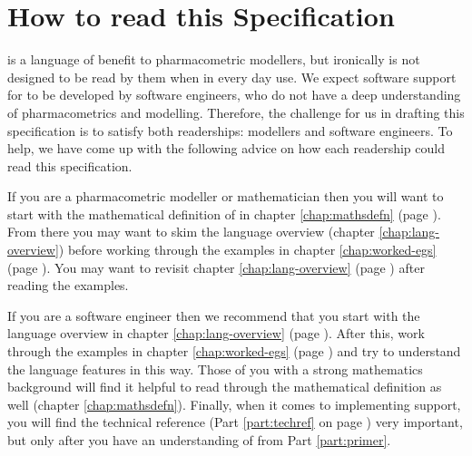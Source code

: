 \section{How to read this Specification}

\pharmml is a language of benefit to pharmacometric modellers, but ironically is not designed to be read by
them when in every day use. We expect software support for \pharmml to be developed by software engineers,
who do not have a deep understanding of pharmacometrics and modelling. Therefore, the challenge for us in
drafting this specification is to satisfy both readerships: modellers and software engineers. To help, we
have come up with the following advice on how each readership could read this specification.

If you are a pharmacometric modeller or mathematician then you will want to start with the mathematical
definition of \pharmml in chapter \ref{chap:mathsdefn} (page \pageref{chap:mathsdefn}). From there you
may want to skim the language overview (chapter \ref{chap:lang-overview}) before working through the
examples in chapter \ref{chap:worked-egs} (page \pageref{chap:worked-egs}). You may want to revisit
chapter \ref{chap:lang-overview} (page \pageref{chap:lang-overview}) after reading the examples.

If you are a software engineer then we recommend that you start with the language overview in chapter
\ref{chap:lang-overview} (page \pageref{chap:lang-overview}). After this, work through the examples
in chapter \ref{chap:worked-egs} (page \pageref{chap:worked-egs}) and try to understand the language
features in this way. Those of you with a strong mathematics background will find it helpful to read
through the mathematical definition as well (chapter \ref{chap:mathsdefn}). Finally, when it comes to
implementing \pharmml support, you will find the technical reference (Part \ref{part:techref} on
page \pageref{part:techref}) very important, but only after you have an understanding of \pharmml
from Part \ref{part:primer}.



